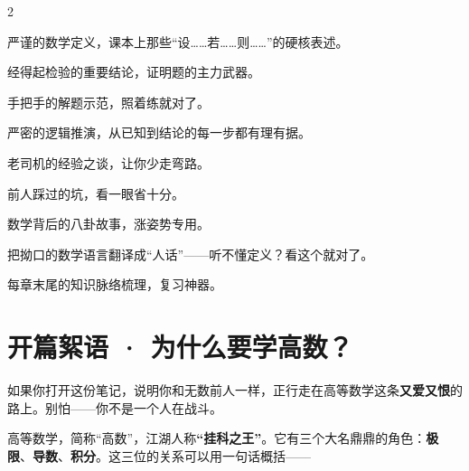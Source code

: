 \documentclass[11pt,a4paper]{article}
\newcommand{\keyw}[1]{\colorbox{cYellowL}{\textbf{\color{cOrange}#1}}}
\begin{document}
\vspace{6pt}
\begin{multicols}{2}
\begin{defbox*}[定义 · 蓝]严谨的数学定义，课本上那些“设……若……则……”的硬核表述。\end{defbox*}
\begin{thmbox*}[定理 · 紫]经得起检验的重要结论，证明题的主力武器。\end{thmbox*}
\begin{egbox*}[例题 · 青]手把手的解题示范，照着练就对了。\end{egbox*}
\begin{proofbox}[证明 · 靛蓝]严密的逻辑推演，从已知到结论的每一步都有理有据。\end{proofbox}
\begin{tipbox}[技巧 · 橙]老司机的经验之谈，让你少走弯路。\end{tipbox}
\begin{warnbox}[易错 · 玫红]前人踩过的坑，看一眼省十分。\end{warnbox}
\begin{eggbox}[冷知识 · 黄]数学背后的八卦故事，涨姿势专用。\end{eggbox}
\end{multicols}

\begin{plainbox}[白话解读 · 灰]
把拗口的数学语言翻译成“人话”——听不懂定义？看这个就对了。
\end{plainbox}

\begin{sumbox}[小结 · 绿]每章末尾的知识脉络梳理，复习神器。\end{sumbox}

\newpage

\section*{\color{cBlue}开篇絮语 · 为什么要学高数？}

\begin{leadbox}[致每一位被高数“折磨”的你]
如果你打开这份笔记，说明你和无数前人一样，正行走在高等数学这条\keyw{又爱又恨}的路上。别怕——你不是一个人在战斗。
\end{leadbox}

高等数学，简称“高数”，江湖人称\keyw{“挂科之王”}。它有三个大名鼎鼎的角色：\textbf{极限}、\textbf{导数}、\textbf{积分}。这三位的关系可以用一句话概括——
\end{document}
